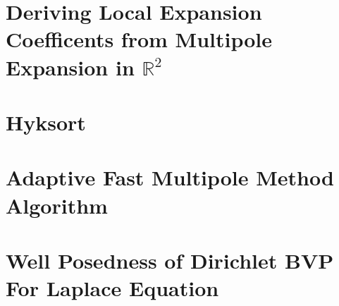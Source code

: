 
\chapter{Deriving Local Expansion Coefficents from Multipole Expansion in $\mathbb{R}^2$}\label{app:locals}


\chapter{Hyksort}\label{app:hyksort}


\chapter{Adaptive Fast Multipole Method Algorithm}\label{app:adaptive_fmm}


\chapter{Well Posedness of Dirichlet BVP For Laplace Equation}\label{app:laplace_bvp}

